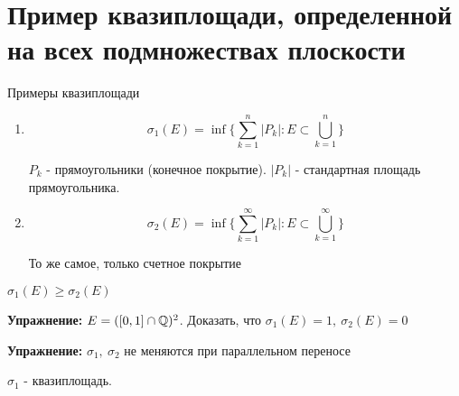 \section{Пример квазиплощади, определенной на всех подмножествах плоскости \href{https://youtu.be/p9C57KDo1Yg?t=7344}{\Walley}}

Примеры квазиплощади

\begin{enumerate}
    \item \[\sigma_1(E) = \inf \bigg\{ \sum_{k=1}^{n}|P_k| : E \subset \bigcup\limits_{k=1}^n \bigg\} \]

$P_k$ - прямоугольники (конечное покрытие). $|P_k|$ - стандартная площадь прямоугольника.
    \item \[\sigma_2(E) = \inf \bigg\{ \sum_{k=1}^{\infty}|P_k| : E \subset \bigcup\limits_{k=1}^{\infty} \bigg\} \]

То же самое, только счетное покрытие
\end{enumerate}

\notice \; $\sigma_1(E) \geqslant \sigma_2(E)$

\textbf{Упражнение:} $E = ([0, 1] \cap \mathbb{Q})^2$. Доказать, что $\sigma_1(E) = 1,\ \sigma_2(E) = 0$

\textbf{Упражнение:} $\sigma_1,\ \sigma_2$ не меняются при параллельном переносе

\begin{theorem-non}
    $\sigma_1$ - квазиплощадь.
\end{theorem-non}

